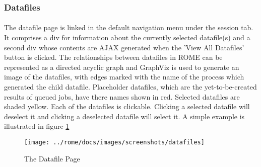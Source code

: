 \subsubsection{Datafiles}
\label{sec:view_datafiles}

\paragraph{}
The datafile page is linked in the default navigation menu under the session tab. It comprises a div for information about the currently selected datafile(s) and a second div whose contents are AJAX generated when the 'View All Datafiles' button is clicked. The relationships between datafiles in ROME can be represented as a directed acyclic graph and GraphViz is used to generate an image of the datafiles, with edges marked with the name of the process which generated the child datafile. Placeholder datafiles, which are the yet-to-be-created results of queued jobs, have there names shown in red. Selected datafiles are shaded yellow. Each of the datafiles is clickable. Clicking a selected datafile will deselect it and clicking a deselected datafile will select it. A simple example is illustrated in figure \ref{fig:view_datafiles}

\begin{figure}[h]
\centering
\texttt{[image: ../rome/docs/images/screenshots/datafiles]}
\caption{The Datafile Page}\label{fig:view_datafiles}
\end{figure}

\clearpage